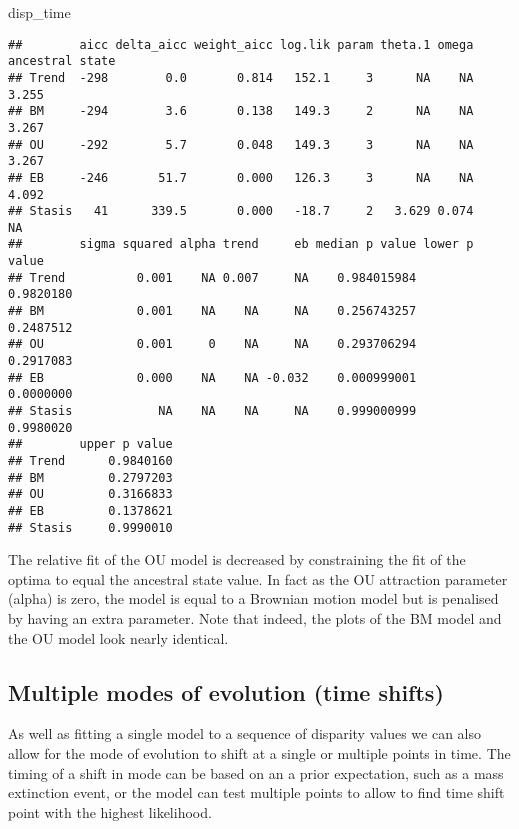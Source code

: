 \documentclass[
]{book}
\newenvironment{Shaded}{\begin{snugshade}}{\end{snugshade}}
\newcommand{\NormalTok}[1]{#1}
\begin{document}
\begin{Shaded}
\begin{Highlighting}[]
\NormalTok{disp\_time}
\end{Highlighting}
\end{Shaded}

\begin{verbatim}
##        aicc delta_aicc weight_aicc log.lik param theta.1 omega ancestral state
## Trend  -298        0.0       0.814   152.1     3      NA    NA           3.255
## BM     -294        3.6       0.138   149.3     2      NA    NA           3.267
## OU     -292        5.7       0.048   149.3     3      NA    NA           3.267
## EB     -246       51.7       0.000   126.3     3      NA    NA           4.092
## Stasis   41      339.5       0.000   -18.7     2   3.629 0.074              NA
##        sigma squared alpha trend     eb median p value lower p value
## Trend          0.001    NA 0.007     NA    0.984015984     0.9820180
## BM             0.001    NA    NA     NA    0.256743257     0.2487512
## OU             0.001     0    NA     NA    0.293706294     0.2917083
## EB             0.000    NA    NA -0.032    0.000999001     0.0000000
## Stasis            NA    NA    NA     NA    0.999000999     0.9980020
##        upper p value
## Trend      0.9840160
## BM         0.2797203
## OU         0.3166833
## EB         0.1378621
## Stasis     0.9990010
\end{verbatim}

The relative fit of the OU model is decreased by constraining the fit of the optima to equal the ancestral state value.
In fact as the OU attraction parameter (alpha) is zero, the model is equal to a Brownian motion model but is penalised by having an extra parameter.
Note that indeed, the plots of the BM model and the OU model look nearly identical.

\hypertarget{multiple-modes-of-evolution-time-shifts}{%
\subsection{Multiple modes of evolution (time shifts)}\label{multiple-modes-of-evolution-time-shifts}}

As well as fitting a single model to a sequence of disparity values we can also allow for the mode of evolution to shift at a single or multiple points in time.
The timing of a shift in mode can be based on an a prior expectation, such as a mass extinction event, or the model can test multiple points to allow to find time shift point with the highest likelihood.
\end{document}
